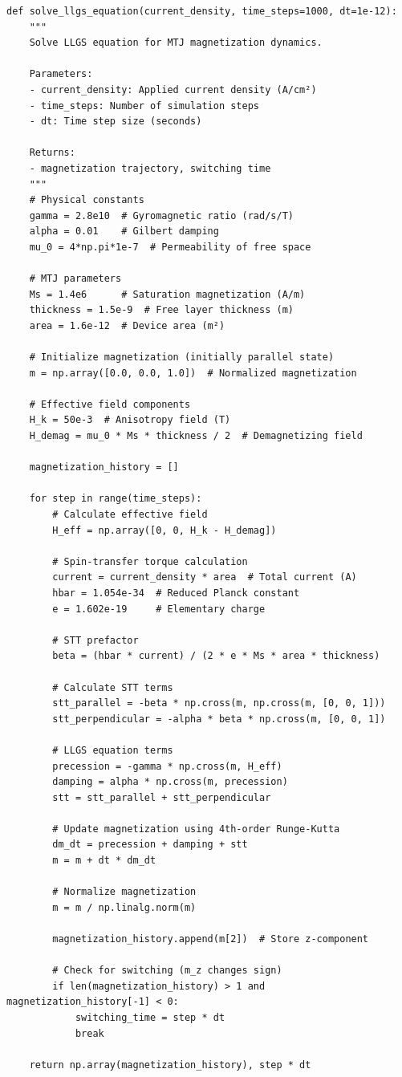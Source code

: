 \documentclass[conference]{IEEEtran}
\begin{document}
\begin{lstlisting}[caption={LLGS equation numerical solver implementation}]
def solve_llgs_equation(current_density, time_steps=1000, dt=1e-12):
    """
    Solve LLGS equation for MTJ magnetization dynamics.
    
    Parameters:
    - current_density: Applied current density (A/cm²)
    - time_steps: Number of simulation steps  
    - dt: Time step size (seconds)
    
    Returns:
    - magnetization trajectory, switching time
    """
    # Physical constants
    gamma = 2.8e10  # Gyromagnetic ratio (rad/s/T)
    alpha = 0.01    # Gilbert damping
    mu_0 = 4*np.pi*1e-7  # Permeability of free space
    
    # MTJ parameters
    Ms = 1.4e6      # Saturation magnetization (A/m)
    thickness = 1.5e-9  # Free layer thickness (m)
    area = 1.6e-12  # Device area (m²)
    
    # Initialize magnetization (initially parallel state)
    m = np.array([0.0, 0.0, 1.0])  # Normalized magnetization
    
    # Effective field components
    H_k = 50e-3  # Anisotropy field (T)
    H_demag = mu_0 * Ms * thickness / 2  # Demagnetizing field
    
    magnetization_history = []
    
    for step in range(time_steps):
        # Calculate effective field
        H_eff = np.array([0, 0, H_k - H_demag])
        
        # Spin-transfer torque calculation
        current = current_density * area  # Total current (A)
        hbar = 1.054e-34  # Reduced Planck constant
        e = 1.602e-19     # Elementary charge
        
        # STT prefactor
        beta = (hbar * current) / (2 * e * Ms * area * thickness)
        
        # Calculate STT terms
        stt_parallel = -beta * np.cross(m, np.cross(m, [0, 0, 1]))
        stt_perpendicular = -alpha * beta * np.cross(m, [0, 0, 1])
        
        # LLGS equation terms
        precession = -gamma * np.cross(m, H_eff)
        damping = alpha * np.cross(m, precession)
        stt = stt_parallel + stt_perpendicular
        
        # Update magnetization using 4th-order Runge-Kutta
        dm_dt = precession + damping + stt
        m = m + dt * dm_dt
        
        # Normalize magnetization
        m = m / np.linalg.norm(m)
        
        magnetization_history.append(m[2])  # Store z-component
        
        # Check for switching (m_z changes sign)
        if len(magnetization_history) > 1 and magnetization_history[-1] < 0:
            switching_time = step * dt
            break
    
    return np.array(magnetization_history), step * dt
\end{lstlisting}
\end{document}
